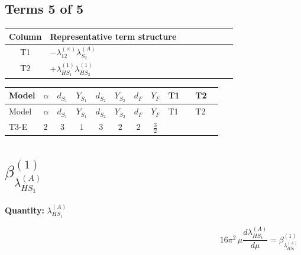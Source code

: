 \documentclass[8pt]{article}
\begin{document}
\begin{landscape}
\subsection*{Terms 5 of 5}
\begin{center}
\begin{tabular}{@{}c >{\raggedright\arraybackslash}p{0.82\linewidth}@{}}
\toprule
Column & Representative term structure \\
\midrule
T1 & \(\displaystyle -{\lambda_{12}^{(\times)}} {\lambda_{S_2}^{(A)}}\) \\
\midrule
T2 & \(\displaystyle +{\lambda_{HS_1}^{(1)}} {\lambda_{HS_2}^{(1)}}\) \\
\midrule
\bottomrule
\end{tabular}
\end{center}
\smallskip
\tiny
\begin{longtable}{@{}llcccccc >{\raggedright\arraybackslash}p{0.21\linewidth} >{\raggedright\arraybackslash}p{0.21\linewidth}@{}}
\toprule
Model & $\alpha$ & $d_{S_1}$ & $Y_{S_1}$ & $d_{S_2}$ & $Y_{S_2}$ & $d_F$ & $Y_F$ & T1 & T2 \\
\midrule
\endfirsthead
\toprule
Model & $\alpha$ & $d_{S_1}$ & $Y_{S_1}$ & $d_{S_2}$ & $Y_{S_2}$ & $d_F$ & $Y_F$ & T1 & T2 \\
\midrule
\endhead
T3-E & $2$ & $3$ & $1$ & $3$ & $2$ & $2$ & $\frac{3}{2}$ & \scriptsize\adjustbox{max width=\linewidth}{$\begin{gathered} -{\lambda_{12}^{(\times)}} {\lambda_{S_2}^{(A)}}\end{gathered}$} & \scriptsize\adjustbox{max width=\linewidth}{$\begin{gathered} +{\lambda_{HS_1}^{(1)}} {\lambda_{HS_2}^{(1)}}\end{gathered}$} \\
\midrule
\bottomrule
\end{longtable}
\clearpage
\section*{$\beta_{\lambda_{HS_1}^{(A)}}^{(1)}$}
\noindent\textbf{Quantity: }$\lambda_{HS_1}^{(A)}$\par\smallskip
\[16\pi^2\,\mu\frac{d \lambda_{HS_1}^{(A)}}{d\mu}=\beta_{\lambda_{HS_1}^{(A)}}^{(1)}\]

\end{landscape}
\end{document}
